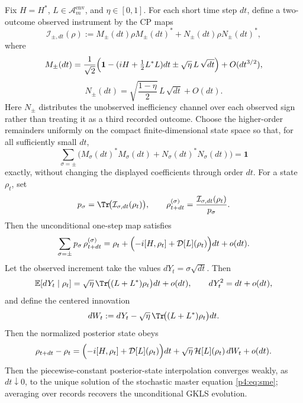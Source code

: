 \documentclass[12pt,a4paper]{article}
\begin{document}
\begin{theorem}
\label{p4:thm:weak-monitoring-diffusive}
Fix \(H=H^*\), \(L\in\mathcal A_m^{\mathrm{env}}\), and \(\eta\in[0,1]\).
For each short time step \(dt\), define a two-outcome observed instrument by
the CP maps
\[
\mathcal I_{\pm,dt}(\rho)
:=
M_\pm(dt)\rho M_\pm(dt)^*
+
N_\pm(dt)\rho N_\pm(dt)^*,
\]
where
\[
M_\pm(dt)
=
\frac1{\sqrt2}
\Bigl(
\mathbf 1-(iH+\tfrac12L^*L)dt \pm \sqrt{\eta}\,L\,\sqrt{dt}
\Bigr)
+O(dt^{3/2}),
\]
\[
N_\pm(dt)
=
\sqrt{\frac{1-\eta}{2}}\,L\,\sqrt{dt}+O(dt).
\]
Here \(N_\pm\) distributes the unobserved inefficiency channel over each
observed sign rather than treating it as a third recorded outcome.  Choose
the higher-order remainders uniformly on the compact finite-dimensional state
space so that, for all sufficiently small \(dt\),
\[
\sum_{\sigma=\pm}
\bigl(M_\sigma(dt)^*M_\sigma(dt)
+N_\sigma(dt)^*N_\sigma(dt)\bigr)
=\mathbf 1
\]
exactly, without changing the displayed coefficients through order \(dt\).
For a state \(\rho_t\), set
\[
p_\sigma=\Tr\!\bigl(\mathcal I_{\sigma,dt}(\rho_t)\bigr),
\qquad
\rho_{t+dt}^{(\sigma)}
=\frac{\mathcal I_{\sigma,dt}(\rho_t)}{p_\sigma}.
\]
Then the unconditional one-step map satisfies
\begin{equation}
\label{p4:eq:weak-monitor-uncond}
\sum_{\sigma=\pm} p_\sigma\,\rho_{t+dt}^{(\sigma)}
=
\rho_t
+
\Bigl(-i[H,\rho_t]+\mathcal D[L](\rho_t)\Bigr)dt
+
o(dt).
\end{equation}
Let the observed increment take the values \(dY_t=\sigma\sqrt{dt}\).
Then
\[
\mathbb E[dY_t\mid \rho_t]
=
\sqrt{\eta}\,\Tr\!\bigl((L+L^*)\rho_t\bigr)dt+o(dt),
\qquad
dY_t^2=dt+o(dt),
\]
and define the centered innovation
\[
dW_t:=dY_t-\sqrt{\eta}\,\Tr\!\bigl((L+L^*)\rho_t\bigr)dt.
\]
Then the normalized posterior state obeys
\begin{equation}
\label{p4:eq:weak-monitor-step}
\rho_{t+dt}-\rho_t
=
\Bigl(-i[H,\rho_t]+\mathcal D[L](\rho_t)\Bigr)dt
+
\sqrt{\eta}\,\mathcal H[L](\rho_t)\,dW_t
+
o(dt).
\end{equation}
Then the piecewise-constant posterior-state interpolation converges weakly,
as \(dt\downarrow0\), to the unique solution of the stochastic master
equation \eqref{p4:eq:sme}; averaging over records recovers the unconditional
GKLS evolution.
\end{theorem}
\end{document}
